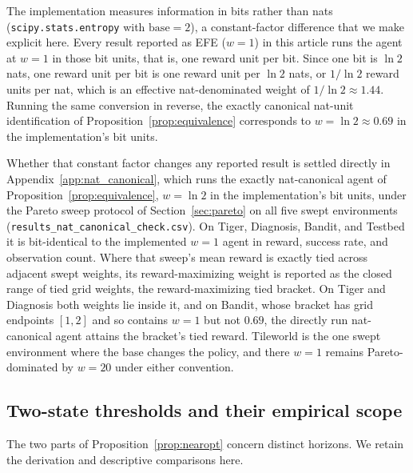 The implementation measures information in bits rather than nats (\texttt{scipy.stats.entropy} with $\mathrm{base}{=}2$), a constant-factor difference that we make explicit here. Every result reported as EFE ($w{=}1$) in this article runs the agent at $w{=}1$ in those bit units, that is, one reward unit per bit. Since one bit is $\ln 2$ nats, one reward unit per bit is one reward unit per $\ln 2$ nats, or $1/\ln 2$ reward units per nat, which is an effective nat-denominated weight of $1/\ln 2 \approx 1.44$. Running the same conversion in reverse, the exactly canonical nat-unit identification of Proposition~\ref{prop:equivalence} corresponds to $w = \ln 2 \approx 0.69$ in the implementation's bit units.

Whether that constant factor changes any reported result is settled directly in Appendix~\ref{app:nat_canonical}, which runs the exactly nat-canonical agent of Proposition~\ref{prop:equivalence}, $w{=}\ln 2$ in the implementation's bit units, under the Pareto sweep protocol of Section~\ref{sec:pareto} on all five swept environments (\texttt{results\_\allowbreak nat\_\allowbreak canonical\_\allowbreak check.csv}). On Tiger, Diagnosis, Bandit, and Testbed it is bit-identical to the implemented $w{=}1$ agent in reward, success rate, and observation count. Where that sweep's mean reward is exactly tied across adjacent swept weights, its reward-maximizing weight is reported as the closed range of tied grid weights, the reward-maximizing tied bracket. On Tiger and Diagnosis both weights lie inside it, and on Bandit, whose bracket has grid endpoints $[1, 2]$ and so contains $w{=}1$ but not $0.69$, the directly run nat-canonical agent attains the bracket's tied reward. Tileworld is the one swept environment where the base changes the policy, and there $w{=}1$ remains Pareto-dominated by $w{=}20$ under either convention.

\subsection{Two-state thresholds and their empirical scope}
\label{app:theory_thresholds}

The two parts of Proposition~\ref{prop:nearopt} concern distinct horizons. We retain the derivation and descriptive comparisons here.

